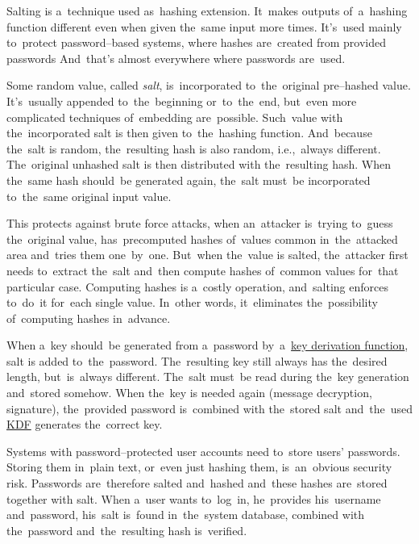 \label{salt}
Salting is a~technique used as~hashing extension.
It~makes outputs of~a~hashing function different even when given the~same input more times.
It's~used mainly to~protect password--based systems, where hashes are~created from provided passwords
And~that's almost everywhere where passwords are~used.

Some random value, called \textit{salt}, is~incorporated to~the~original pre--hashed value.
It's~usually appended to~the~beginning or~to~the~end, but~even more complicated techniques of~embedding are~possible.
Such~value with the~incorporated salt is then given to~the~hashing function.
And~because the~salt is random, the~resulting hash is also random, i.e.,~always different.
The~original unhashed salt is then distributed with the~resulting hash.
When the~same hash should~be generated again, the~salt must~be incorporated to~the~same original input value.

This protects against brute force attacks, when an~attacker is~trying to~guess the~original value, has~precomputed hashes of~values common in~the~attacked area and~tries them one~by~one.
But~when the~value is salted, the~attacker first needs to~extract the~salt and~then compute hashes of~common values for~that particular case.
Computing hashes is a~costly operation, and~salting enforces to~do~it for~each single value.
In~other words, it~eliminates the~possibility of~computing hashes in~advance.

When a~key should~be generated from a~password by~a~\hyperref[keypassword]{key derivation function}, salt is added to~the~password.
The~resulting key still always has the~desired length, but~is~always different.
The~salt must~be read during the~key generation and~stored somehow.
When the~key is needed again (message decryption, signature), the~provided password is~combined with the~stored salt and~the~used \hyperref[keypassword]{KDF} generates the~correct key.

Systems with password--protected user accounts need to~store users' passwords.
Storing them in~plain text, or~even just hashing them, is~an~obvious security risk.
Passwords are~therefore salted and~hashed and~these hashes are~stored together with salt.
When a~user wants to~log~in, he~provides his~username and~password, his~salt is~found in~the~system database, combined with the~password and~the~resulting hash is~verified.
